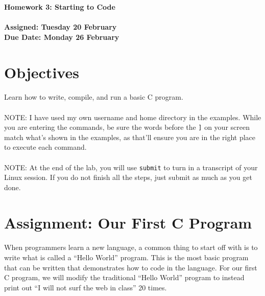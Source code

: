 \documentclass[letter,11pt]{article}
\begin{document}
\huge
\textbf{Homework 3: Starting to Code}
\normalsize
\\ ~~ \\
\textbf{Assigned: Tuesday 20 February} \\
\textbf{Due Date: Monday 26 February}

\section*{Objectives}
\paragraph{}Learn how to write, compile, and run a basic C program.

\paragraph{}NOTE: I have used my own username and home directory in the examples. While you are entering the commands, be sure the words before the \texttt{]} on your screen match what’s shown in the examples, as that’ll ensure you are in the right place to execute each command.

\paragraph{}NOTE: At the end of the lab, you will use \texttt{submit} to turn in a transcript of your Linux session. If you do not finish all the steps, just submit as much as you get done.

\section*{Assignment: Our First C Program}
\paragraph{}When programmers learn a new language, a common thing to start off with is to write what is called a ``Hello World'' program. This is the most basic program that can be written that demonstrates how to code in the language. For our first C program, we will modify the traditional ``Hello World'' program to instead print out ``I will not surf the web in class'' 20 times.
\end{document}
